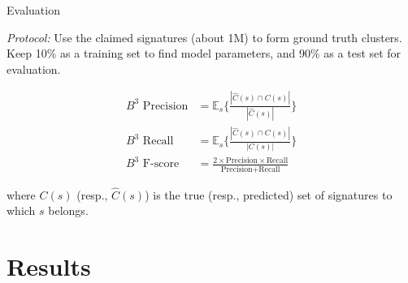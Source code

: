 \documentclass{beamer}
\begin{document}
\begin{frame}{Evaluation}

{\it Protocol:} Use the {\color{blue} claimed signatures} (about 1M) to form {\color{blue} ground truth clusters}. Keep 10\% as a training set to find model parameters, and 90\% as a test set for evaluation.

\begin{align}
\text{$B^3$ Precision} &= \mathbb{E}_s \{ \frac{|\hat{C}(s) \cap C(s)|}{|\hat{C}(s)|}  \} \\
\text{$B^3$ Recall} &= \mathbb{E}_s \{ \frac{|\hat{C}(s) \cap C(s)|}{|C(s)|}  \} \\
\text{$B^3$ F-score} &= \frac{2 \times \text{Precision} \times \text{Recall}}{\text{Precision} + \text{Recall}}
\end{align}

where $C(s)$ (resp., $\hat{C}(s)$) is the true (resp., predicted) set of signatures to which $s$ belongs.




\end{frame}



\section{Results}
\end{document}
